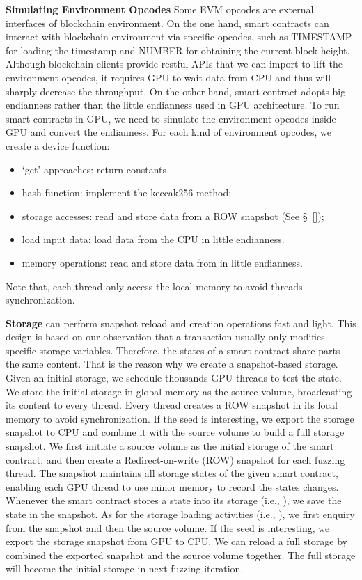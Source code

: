 \noindent \textbf{Simulating Environment Opcodes}
Some EVM opcodes are external interfaces of blockchain environment.
On the one hand, smart contracts can interact with blockchain environment via specific opcodes, such as TIMESTAMP for loading the timestamp and NUMBER for obtaining the current block height. 
%
Although blockchain clients provide restful APIs that we can import to lift the environment opcodes, it requires GPU to wait data from CPU and thus will sharply decrease the {\tool} throughput.
%
On the other hand, smart contract adopts big endianness rather than the little endianness used in GPU architecture. 
To run smart contracts in GPU, we need to simulate the environment opcodes inside GPU and convert the endianness. 
For each kind of environment opcodes, we create a device function:
\begin{itemize}
    \item `get' approaches: return constants
    \item hash function: implement the keccak256  method;
    \item storage accesses: read and store data from a ROW snapshot (See \S~\ref{});
    \item load input data: load data from the CPU in little endianness.
    \item memory operations: read and store data from  in little endianness.
\end{itemize}

Note that, each thread only access the local memory to avoid threads synchronization.

\noindent\textbf{Storage}
{\tool} can perform snapshot reload and creation operations fast and light. This design is based on our observation that a transaction usually only modifies specific storage variables. Therefore, the states of a smart contract share parts the same content. That is the reason why we create a snapshot-based storage. 
%
Given an initial storage, we schedule thousands GPU threads to test the state. We store the initial storage in global memory as the source volume, broadcasting its content to every thread. Every thread creates a ROW snapshot in its local memory to avoid synchronization. If the seed is interesting, we export the storage snapshot to CPU and combine it with the source volume to build a full storage snapshot.   
%
We first initiate a source volume as the initial storage of the smart contract, and then create a Redirect-on-write (ROW) snapshot for each fuzzing thread. The snapshot maintains all storage states of the given smart contract, enabling each GPU thread to use minor memory to record the states changes. 
%
Whenever the smart contract stores a state into its storage (i.e., ), we save the state in the snapshot. As for the storage loading activities (i.e., ), we first enquiry from the snapshot and then the source volume. 
If the seed is interesting, we export the storage snapshot from GPU to CPU. 
We can reload a full storage by combined the exported snapshot and the source volume together. The full storage will become the initial storage in next fuzzing iteration.